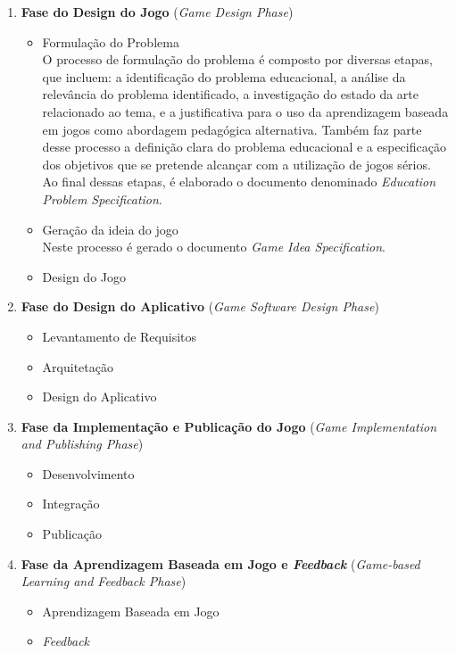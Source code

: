 \begin{enumerate}
  \item \textbf{Fase do Design do Jogo} (\emph{Game Design Phase})
  \begin{itemize}
    \item Formulação do Problema \\
      O processo de formulação do problema é composto por diversas etapas, que
      incluem: a identificação do problema educacional, a análise da relevância do
      problema identificado, a investigação do estado da arte relacionado ao tema, e
      a justificativa para o uso da aprendizagem baseada em jogos como abordagem
      pedagógica alternativa. Também faz parte desse processo a definição clara do
      problema educacional e a especificação dos objetivos que se pretende alcançar
      com a utilização de jogos sérios. Ao final dessas etapas, é elaborado o
      documento denominado \emph{Education Problem Specification}.
    \item Geração da ideia do jogo \\
      Neste processo é gerado o documento \emph{Game Idea Specification}.
    \item Design do Jogo
  \end{itemize}
  \item \textbf{Fase do Design do Aplicativo} (\emph{Game Software Design Phase})
  \begin{itemize}
    \item Levantamento de Requisitos
    \item Arquitetação
    \item Design do Aplicativo
  \end{itemize}
  \item \textbf{Fase da Implementação e Publicação do Jogo} (\emph{Game Implementation and Publishing Phase})
  \begin{itemize}
    \item Desenvolvimento
    \item Integração
    \item Publicação
  \end{itemize}
  \item \textbf{Fase da Aprendizagem Baseada em Jogo e \emph{Feedback}} (\emph{Game-based Learning and Feedback Phase})
  \begin{itemize}
    \item Aprendizagem Baseada em Jogo
    \item \emph{Feedback}
  \end{itemize}
\end{enumerate}



